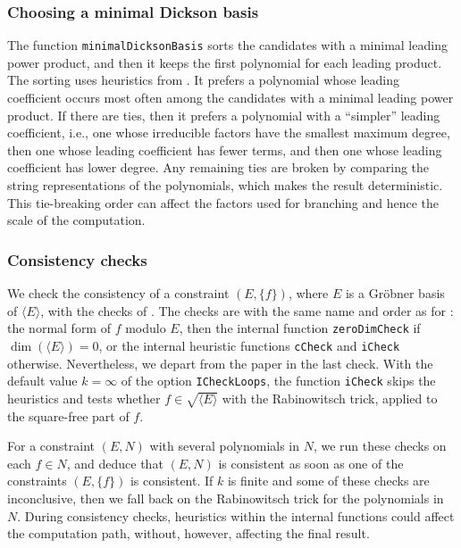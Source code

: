 \documentclass[11pt]{amsart}
\theoremstyle{plain}
\theoremstyle{definition}
\theoremstyle{remark}
\begin{document}
\subsubsection*{Choosing a minimal Dickson basis}

The function \texttt{minimalDicksonBasis} sorts the candidates with a minimal leading power product, and then it keeps the first polynomial for each leading product. The sorting uses heuristics from \cite[Section 7.1]{KAPUR201327}. It prefers a polynomial whose leading coefficient occurs most often among the candidates with a minimal leading power product. If there are ties, then it prefers a polynomial with a ``simpler'' leading coefficient, i.e., one whose irreducible factors have the smallest maximum degree, then one whose leading coefficient has fewer terms, and then one whose leading coefficient has lower degree. Any remaining ties are broken by comparing the string representations of the polynomials, which makes the result deterministic. This tie-breaking order can affect the factors used for branching and hence the scale of the computation.

\subsubsection*{Consistency checks}

We check the consistency of a constraint $(E,\lbrace f\rbrace)$, where $E$ is a Gröbner basis of $\langle E\rangle$, with the checks of \cite[Section~5.3]{KAPUR201327}. The checks are with the same name and order as for \cite{KAPUR201327}: the normal form of $f$ modulo $E$, then the internal function \texttt{zeroDimCheck} if $\dim(\langle E\rangle)=0$, or the internal heuristic functions \texttt{cCheck} and \texttt{iCheck} otherwise.
Nevertheless, we depart from the paper in the last check. With the default value $k=\infty$ of the option \texttt{ICheckLoops}, the function \texttt{iCheck} skips the heuristics and tests whether $f\in\sqrt{\langle E\rangle}$ with the Rabinowitsch trick, applied to the square-free part of $f$.

For a constraint $(E,N)$ with several polynomials in $N$, we run these checks on each $f\in N$, and deduce that $(E,N)$ is consistent as soon as one of the constraints $(E,\lbrace f\rbrace)$ is consistent. If $k$ is finite and some of these checks are inconclusive, then we fall back on the Rabinowitsch trick for the polynomials in $N$. During consistency checks, heuristics within the internal functions could affect the computation path, without, however, affecting the final result.
\end{document}
